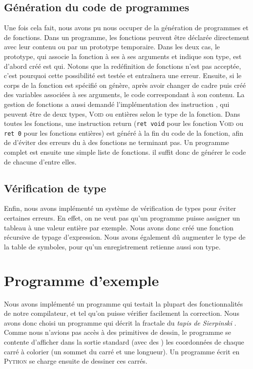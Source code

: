 \documentclass[french]{article}
\begin{document}
  \subsection{Génération du code de programmes}
Une fois cela fait, nous avons pu nous occuper de la génération de programmes et de fonctions. Dans un programme, les fonctions peuvent être déclarée directement avec leur contenu ou par un prototype temporaire. Dans les deux cas, le prototype, qui associe la fonction à ses à ses arguments et indique son type, est d'abord créé est qui. Notons que la redéfinition de fonctions n'est pas acceptée, c'est pourquoi cette possibilité est testée et entraînera une erreur. Ensuite, si le corps de la fonction est spécifié on génère, après avoir changer de cadre puis créé des variables associées à ses arguments, le code correspondant à son contenu. La gestion de fonctions a aussi demandé l'implémentation des instruction \return, qui peuvent être de deux types, \textsc{Void} ou entières selon le type de la fonction. Dans toutes les fonctions, une instruction return (\texttt{ret void} pour les fonction \textsc{Void} ou \texttt{ret 0} pour les fonctions entières) est généré à la fin du code de la fonction, afin de d'éviter des erreurs du à des fonctions ne terminant pas.
Un programme complet est ensuite une simple liste de fonctions. il suffit donc de générer le code de chacune d'entre elles.
  \subsection{Vérification de type}
  Enfin, nous avons implémenté un système de vérification de types pour éviter certaines erreurs. En effet, on ne veut pas qu'un programme puisse assigner un tableau à une valeur entière par exemple. Nous avons donc créé une fonction récursive de typage d'expression. Nous avons également dû augmenter le type de la table de symboles, pour qu'un enregistrement retienne aussi son type.

  
\section{Programme d'exemple}
Nous avons implémenté un programme qui testait la plupart des fonctionnalités de notre compilateur, et tel qu'on puisse vérifier facilement la correction. Nous avons donc choisi un programme qui décrit la fractale du \textit{tapis de Sierpinski} . Comme nous n'avions pas accès à des primitives de dessin, le programme se contente d'afficher dans la sortie standard (avec des \iprint) les coordonnées de chaque carré à colorier (un sommet du carré et une longueur). Un programme écrit en \textsc{Python} se charge ensuite de dessiner ces carrés.
\end{document}

